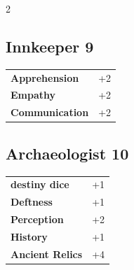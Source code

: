 \begin{multicols}{2}
\begin{tcolorbox}

\end{tcolorbox}

\begin{tcolorbox}
    \subsection*{Innkeeper \hfill \small{9 }}
    \tcblower




\begin{tabular}{@{}ll@{}}
    \textbf{Apprehension} & +2\\
    \textbf{Empathy} & +2\\
    \textbf{Communication} & +2\\
\end{tabular}


\end{tcolorbox}

\begin{tcolorbox}
    \subsection*{Archaeologist \hfill \small{10 }}
    \tcblower




\begin{tabular}{@{}ll@{}}
    \textbf{destiny dice} & +1\\
    \textbf{Deftness} & +1\\
    \textbf{Perception} & +2\\
    \textbf{History} & +1\\
    \textbf{Ancient Relics} & +4\\
\end{tabular}


\end{tcolorbox}


\end{multicols}
